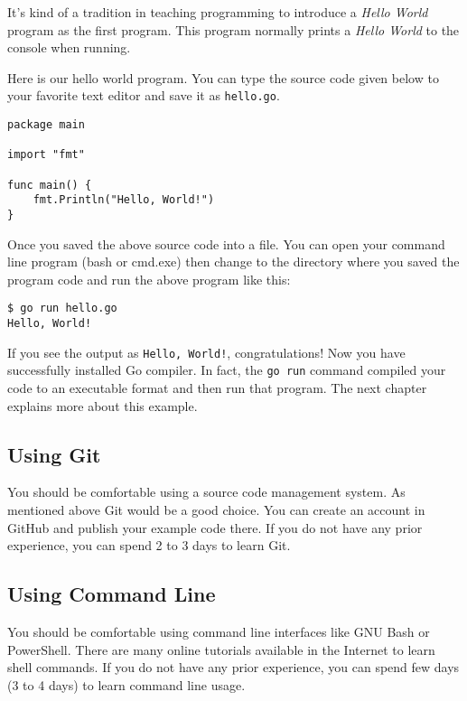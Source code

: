 It's kind of a tradition in teaching programming to introduce a \textit{Hello
World} program as the first program. This program normally prints
a \textit{Hello World} to the console when running.

Here is our hello world program. You can type the source code given below to
your favorite text editor and save it as \texttt{hello.go}.

\begin{lstlisting}[caption=Hello World! (hello.go)]
package main

import "fmt"

func main() {
	fmt.Println("Hello, World!")
}
\end{lstlisting}

Once you saved the above source code into a file. You can open your command line
program (bash or cmd.exe) then change to the directory where you saved the
program code and run the above program like this:

\begin{lstlisting}[numbers=none]
$ go run hello.go
Hello, World!
\end{lstlisting}

If you see the output as \texttt{Hello, World!}, congratulations! Now you have
successfully installed Go compiler. In fact, the \texttt{go run} command
compiled your code to an executable format and then run that program. The next
chapter explains more about this example.

\subsection{Using Git}

You should be comfortable using a source code management system. As mentioned
above Git would be a good choice. You can create an account in GitHub
and publish your example code there. If you do not have any prior experience,
you can spend 2 to 3 days to learn Git.

\subsection{Using Command Line}

You should be comfortable using command line interfaces like
GNU Bash or PowerShell. There are many online tutorials available in the
Internet to learn shell commands. If you do not have any prior experience, you
can spend few days (3 to 4 days) to learn command line usage.

